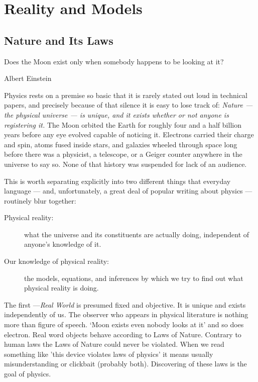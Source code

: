 \chapter{Reality and Models}
\label{rm}

\section{Nature and Its Laws}
\label{rm:nl}
\epigraph{Does the Moon exist only when somebody happens to be looking at it?}
{Albert Einstein}

Physics rests on a premise so basic that it is rarely stated out loud in
technical papers, and precisely because of that silence it is easy to lose
track of: \emph{Nature --- the physical universe --- is unique, and it
exists whether or not anyone is registering it.} The Moon orbited the Earth
for roughly four and a half billion years before any eye evolved capable of
noticing it. Electrons carried their charge and spin, atoms fused inside
stars, and galaxies wheeled through space long before there was a physicist,
a telescope, or a Geiger counter anywhere in the universe to say so. None of
that history was suspended for lack of an audience.

This is worth separating explicitly into two different things that everyday
language --- and, unfortunately, a great deal of popular writing about
physics --- routinely blur together:
\begin{description}
    \item [Physical reality:] what the universe and its constituents
  are actually doing, independent of anyone's knowledge of it.
    \item [ Our knowledge of physical reality:] the models, equations,
   and inferences by which we try to find out what physical
  reality is doing.
\end{description}

The first ---\emph{Real World} is presumed fixed and objective. It is unique
and exists independently of us. The observer who appears in physical literature
is nothing more than figure of speech. `Moon exists even nobody looks at it'
and so does electron. Real word objects behave according to Laws of Nature.
Contrary to human laws the Laws of Nature could never be violated. When we read
something like 'this device violates laws of physics' it means usually
misunderstanding or clickbait (probably both). Discovering of these laws is the
goal of physics. 

